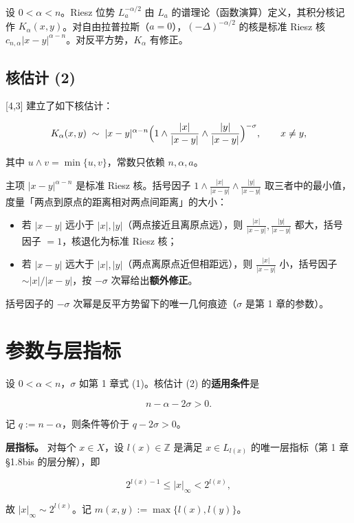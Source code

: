 \documentclass[a4paper,11pt,openany]{ctexbook}
\numberwithin{equation}{chapter}
\numberwithin{figure}{chapter}
\numberwithin{table}{chapter}
\begin{document}
设 $0<\alpha<n$。Riesz 位势 $L_a^{-\alpha/2}$ 由 $L_a$ 的谱理论（函数演算）定义，其积分核记作 $K_\alpha(x,y)$。对自由拉普拉斯（$a=0$），$(-\Delta)^{-\alpha/2}$ 的核是标准 Riesz 核 $c_{n,\alpha}|x-y|^{\alpha-n}$。对反平方势，$K_\alpha$ 有修正。

\subsection{核估计 (2)}

[4,3] 建立了如下核估计：

$$K_\alpha(x,y)\;\sim\; |x-y|^{\alpha-n}\Bigl(1\wedge\frac{|x|}{|x-y|}\wedge\frac{|y|}{|x-y|}\Bigr)^{-\sigma},\qquad x\neq y,$$

其中 $u\wedge v=\min\{u,v\}$，常数只依赖 $n,\alpha,a$。

\begin{intuitionbox}
主项 $|x-y|^{\alpha-n}$ 是标准 Riesz 核。括号因子 $1\wedge\frac{|x|}{|x-y|}\wedge\frac{|y|}{|x-y|}$ 取三者中的最小值，度量「两点到原点的距离相对两点间距离」的大小：
\end{intuitionbox}

\begin{itemize}
\item 若 $|x-y|$ 远小于 $|x|,|y|$（两点接近且离原点远），则 $\frac{|x|}{|x-y|},\frac{|y|}{|x-y|}$ 都大，括号因子 $=1$，核退化为标准 Riesz 核；
\item 若 $|x-y|$ 远大于 $|x|,|y|$（两点离原点近但相距远），则 $\frac{|x|}{|x-y|}$ 小，括号因子 $\sim|x|/|x-y|$，按 $-\sigma$ 次幂给出\textbf{额外修正}。
\end{itemize}

括号因子的 $-\sigma$ 次幂是反平方势留下的唯一几何痕迹（$\sigma$ 是第 1 章的参数）。

\section{参数与层指标}

设 $0<\alpha<n$，$\sigma$ 如第 1 章式 (1)。核估计 (2) 的\textbf{适用条件}是

$$n-\alpha-2\sigma>0.$$

记 $q:=n-\alpha$，则条件等价于 $q-2\sigma>0$。

\textbf{层指标。} 对每个 $x\in X$，设 $l(x)\in\mathbb Z$ 是满足 $x\in L_{l(x)}$ 的唯一层指标（第 1 章 §1.8bis 的层分解），即

$$2^{l(x)-1}\le|x|_\infty<2^{l(x)},$$

故 $|x|_\infty\sim2^{l(x)}$。记 $m(x,y):=\max\{l(x),l(y)\}$。
\end{document}
